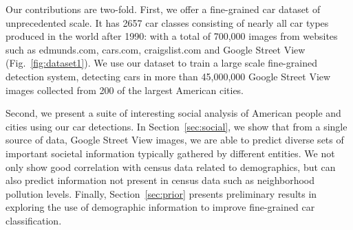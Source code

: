 \documentclass[10pt,twocolumn,letterpaper]{article}
\begin{document}
Our contributions are two-fold. First, we offer a fine-grained car dataset of unprecedented scale. It has 2657 car classes consisting of nearly all car types produced in the world after 1990: with a total of 700,000 images from websites such as edmunds.com, cars.com, craigslist.com and Google Street View (Fig.~\ref{fig:dataset1}). We use our dataset to train a large scale fine-grained detection system, detecting cars in more than 45,000,000 Google Street View images collected from 200 of the largest American cities.

Second, we present a suite of interesting social analysis of American people and cities using our car detections. In Section~\ref{sec:social}, we show that from a single source of data, Google Street View images, we are able to predict diverse sets of important societal information typically gathered by different entities. We not only show good correlation with census data related to demographics, but can also predict information not present in census data such as neighborhood pollution levels. Finally, Section~\ref{sec:prior} presents preliminary results in exploring the use of demographic information to improve fine-grained car classification.
\end{document}
